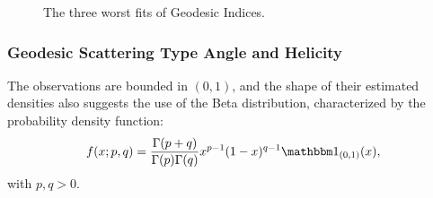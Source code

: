 \documentclass[journal]{IEEEtran}
\begin{document}
	\begin{figure}[hbt]
		\centering
		\caption{The three worst fits of Geodesic Indices.}
	\end{figure}
	
	\subsubsection{Geodesic Scattering Type Angle and Helicity}
	
	The observations are bounded in $(0,1)$, 
	and the shape of their estimated densities also suggests the use of the Beta distribution, characterized by the probability density function:
	\begin{equation}
	f(x; p, q) = \frac{\Gamma(p+q)}{\Gamma(p)\Gamma(q)} x^{p-1} (1-x)^{q-1} \mathbbm 1_{(0,1)}(x),
	\label{eq:BetaDensity}
	\end{equation}
	with $p,q>0$.
	
\end{document}
